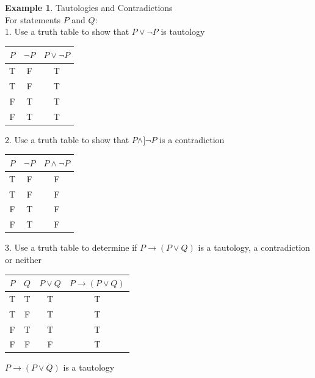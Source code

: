 \documentclass{book}
\theoremstyle{definition}
\newtheorem{example}{Example}[definition]
\theoremstyle{remark}
\begin{document}
\begin{example}
Tautologies and Contradictions \cite[Chap.2, P.C.2.4]{ted} \\

For statements $P$ and $Q$: \\


1. Use a truth table to show that $P \vee \neg P$ is tautology \\

\begin{center}
    \begin{tabular}{|c|c|c|}
        \hline 
        $P$ & $\neg P$ & $P \vee \neg P$ \\ 
        \hline 
        T & F & T \\ 
        \hline 
        T & F & T \\ 
        \hline 
        F & T & T \\ 
        \hline 
        F & T & T \\ 
        \hline 
    \end{tabular} 
\end{center}

2. Use a truth table to show that $P \wedge ]\neg P$ is a contradiction \\

\begin{center}
    \begin{tabular}{|c|c|c|}
        \hline 
        $P$ & $\neg P$ & $P \wedge \neg P$ \\ 
        \hline 
        T & F & F \\ 
        \hline 
        T & F & F \\ 
        \hline 
        F & T & F \\ 
        \hline 
        F & T & F \\ 
        \hline 
    \end{tabular} 
\end{center}

3. Use a truth table to determine if $P \to (P \vee Q)$ is a tautology, a contradiction or neither \\

\begin{center}
    \begin{tabular}{|c|c|c|c|}
        \hline 
        $P$ & $Q$ & $P \vee Q$ & $P \to (P \vee Q)$ \\ 
        \hline 
        T & T & T & T \\ 
        \hline 
        T & F & T & T \\ 
        \hline 
        F & T & T & T \\ 
        \hline 
        F & F & F & T \\ 
        \hline 
    \end{tabular} 
\end{center}

$P \to (P \vee Q)$ is a tautology \\
\end{example}
\end{document}
